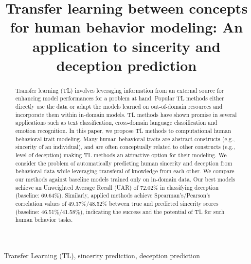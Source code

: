 \documentclass{article}
\title{Transfer learning between concepts for human behavior modeling: An application to sincerity and deception prediction}
\begin{document}
\ninept
%
\maketitle
%
\begin{spacing}{0.89}
\begin{abstract}
Transfer learning (TL) involves leveraging information from an external source for enhancing model performances for a problem at hand. 
Popular TL methods either directly use the data or adapt the models learned on out-of-domain resources and incorporate them within in-domain models. 
TL methods have shown promise in several applications such as text classification, cross-domain language classification and emotion recognition.
In this paper, we propose TL methods to computational human behavioral trait modeling. Many human behavioral traits are abstract constructs (e.g., sincerity of an individual), and are often conceptually related to other constructs (e.g., level of deception) making TL methods an attractive option for their modeling. We consider the problem of automatically predicting human sincerity and deception from behavioral data while leveraging transferal of knowledge from each other. 
We compare our methods against baseline models trained only on in-domain data.
Our best models achieve an Unweighted Average Recall (UAR) of 72.02\% in classifying deception (baseline: 69.64\%). 
Similarly, applied methods achieve Spearman's/Pearson's correlation values of 49.37\%/48.52\% between true and predicted sincerity scores (baseline: 46.51\%/41.58\%), indicating the success and the potential of TL for such human behavior tasks.
 
\end{abstract}
%
\begin{keywords}
Transfer Learning (TL), sincerity prediction, deception prediction 
\end{keywords}
%
\vspace{-3mm}

\end{spacing}
\end{document}
